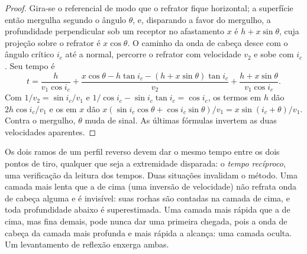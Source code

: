 \begin{proof}
Gira-se o referencial de modo que o refrator fique horizontal; a superfície então mergulha segundo o ângulo
$\theta$, e, disparando a favor do mergulho, a profundidade perpendicular sob um receptor no
afastamento $x$ é $h + x\sin\theta$, cuja projeção sobre o refrator é
$x\cos\theta$. O caminho da onda de cabeça desce com o ângulo crítico $i_c$ até a
normal, percorre o refrator com velocidade $v_2$ e sobe com $i_c$. Seu tempo é
\[
  t = \frac{h}{v_1\cos i_c} + \frac{x\cos\theta - h\tan i_c - (h + x\sin\theta)\tan i_c}{v_2}
  + \frac{h + x\sin\theta}{v_1\cos i_c}.
\]
Com $1/v_2 = \sin i_c/v_1$ e $1/\cos i_c - \sin i_c\tan i_c = \cos i_c$,
os termos em $h$ dão $2h\cos i_c/v_1$ e os em $x$ dão
$x(\sin i_c\cos\theta + \cos i_c\sin\theta)/v_1 = x\sin(i_c + \theta)/v_1$.
Contra o mergulho, $\theta$ muda de sinal. As últimas fórmulas invertem as duas
velocidades aparentes.
\end{proof}

Os dois ramos de um perfil reverso devem dar o mesmo tempo entre os dois
pontos de tiro, qualquer que seja a extremidade disparada: o \emph{tempo recíproco}, uma verificação da
leitura dos tempos. Duas situações invalidam o método. Uma camada mais lenta que a de cima
(uma inversão de velocidade) não refrata onda de cabeça alguma e é invisível: suas rochas são
contadas na camada de cima, e toda profundidade abaixo é superestimada. Uma camada
mais rápida que a de cima, mas fina demais, pode nunca dar uma primeira chegada, pois
a onda de cabeça da camada mais profunda e mais rápida a alcança: uma camada oculta. Um
levantamento de reflexão enxerga ambas.

